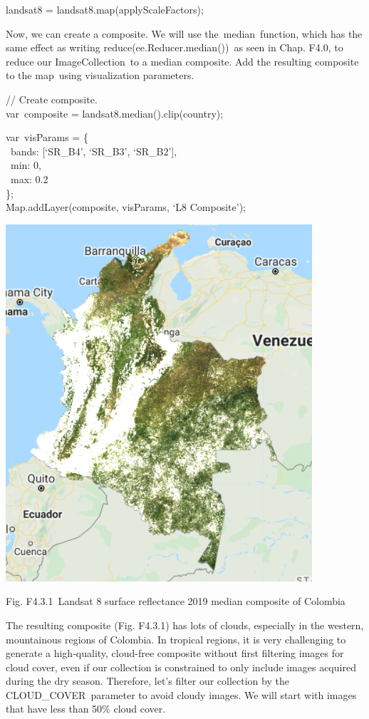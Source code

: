 \documentclass[
  letterpaper,
  DIV=11,
  numbers=noendperiod]{scrreprt}
\begin{document}
landsat8 = landsat8.map(applyScaleFactors);

Now, we can create a composite. We will use the~median~function, which
has the same effect as writing reduce(ee.Reducer.median())~as seen in
Chap. F4.0, to reduce our ImageCollection~to a median composite. Add the
resulting composite to the map~using visualization parameters.

// Create composite.\\
var~composite = landsat8.median().clip(country);

var~visParams = \{\\
\hspace*{0.333em} ~bands: {[}`SR\_B4', `SR\_B3', `SR\_B2'{]},\\
\hspace*{0.333em} ~min: 0,\\
\hspace*{0.333em} ~max: 0.2\\
\};\\
Map.addLayer(composite, visParams, `L8 Composite');

\includegraphics{./F4/image12.png}

Fig. F4.3.1~Landsat 8 surface reflectance 2019 median composite of
Colombia

The resulting composite (Fig. F4.3.1) has lots of clouds, especially in
the western, mountainous regions of Colombia. In tropical regions, it is
very challenging to generate a high-quality, cloud-free composite
without first filtering images for cloud cover, even if our collection
is constrained to only include images acquired during the dry season.
Therefore, let's filter our collection by the CLOUD\_COVER~parameter to
avoid cloudy images. We will start with images that have less than 50\%
cloud cover.
\end{document}
